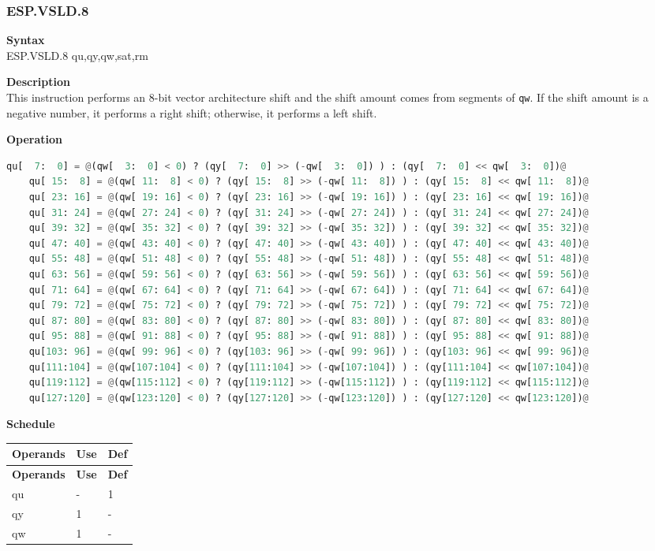 \newpage
\subsubsection{ESP.VSLD.8}\label{instruction:ESPVSLD8}
\textbf{Syntax}\\
ESP.VSLD.8 qu,qy,qw,sat,rm

\textbf{Description}\\
This instruction performs an 8-bit vector architecture shift and the shift amount comes from segments of \lstinline{qw}. If the shift amount is a negative number, it performs a right shift; otherwise, it performs a left shift.

\textbf{Operation}\\
\begin{lstlisting}[language=Python, escapechar=@]
    qu[  7:  0] = @(qw[  3:  0] < 0) ? (qy[  7:  0] >> (-qw[  3:  0]) ) : (qy[  7:  0] << qw[  3:  0])@
    qu[ 15:  8] = @(qw[ 11:  8] < 0) ? (qy[ 15:  8] >> (-qw[ 11:  8]) ) : (qy[ 15:  8] << qw[ 11:  8])@
    qu[ 23: 16] = @(qw[ 19: 16] < 0) ? (qy[ 23: 16] >> (-qw[ 19: 16]) ) : (qy[ 23: 16] << qw[ 19: 16])@
    qu[ 31: 24] = @(qw[ 27: 24] < 0) ? (qy[ 31: 24] >> (-qw[ 27: 24]) ) : (qy[ 31: 24] << qw[ 27: 24])@
    qu[ 39: 32] = @(qw[ 35: 32] < 0) ? (qy[ 39: 32] >> (-qw[ 35: 32]) ) : (qy[ 39: 32] << qw[ 35: 32])@
    qu[ 47: 40] = @(qw[ 43: 40] < 0) ? (qy[ 47: 40] >> (-qw[ 43: 40]) ) : (qy[ 47: 40] << qw[ 43: 40])@
    qu[ 55: 48] = @(qw[ 51: 48] < 0) ? (qy[ 55: 48] >> (-qw[ 51: 48]) ) : (qy[ 55: 48] << qw[ 51: 48])@
    qu[ 63: 56] = @(qw[ 59: 56] < 0) ? (qy[ 63: 56] >> (-qw[ 59: 56]) ) : (qy[ 63: 56] << qw[ 59: 56])@
    qu[ 71: 64] = @(qw[ 67: 64] < 0) ? (qy[ 71: 64] >> (-qw[ 67: 64]) ) : (qy[ 71: 64] << qw[ 67: 64])@
    qu[ 79: 72] = @(qw[ 75: 72] < 0) ? (qy[ 79: 72] >> (-qw[ 75: 72]) ) : (qy[ 79: 72] << qw[ 75: 72])@
    qu[ 87: 80] = @(qw[ 83: 80] < 0) ? (qy[ 87: 80] >> (-qw[ 83: 80]) ) : (qy[ 87: 80] << qw[ 83: 80])@
    qu[ 95: 88] = @(qw[ 91: 88] < 0) ? (qy[ 95: 88] >> (-qw[ 91: 88]) ) : (qy[ 95: 88] << qw[ 91: 88])@
    qu[103: 96] = @(qw[ 99: 96] < 0) ? (qy[103: 96] >> (-qw[ 99: 96]) ) : (qy[103: 96] << qw[ 99: 96])@
    qu[111:104] = @(qw[107:104] < 0) ? (qy[111:104] >> (-qw[107:104]) ) : (qy[111:104] << qw[107:104])@
    qu[119:112] = @(qw[115:112] < 0) ? (qy[119:112] >> (-qw[115:112]) ) : (qy[119:112] << qw[115:112])@
    qu[127:120] = @(qw[123:120] < 0) ? (qy[127:120] >> (-qw[123:120]) ) : (qy[127:120] << qw[123:120])@
\end{lstlisting}

\textbf{Schedule}\\
\begin{longtable}[c]{|l|l|l|}
    \hline
    \rowcolor{lightgray}
    \textbf{Operands} & \textbf{Use} & \textbf{Def} \\\hline
    \endfirsthead
    \hline
    \rowcolor{lightgray}
     \textbf{Operands} & \textbf{Use} & \textbf{Def} \\\hline
    \endhead
    \hline
    \endfoot

  qu & - & 1 \\\hline
  qy & 1 & - \\\hline
  qw & 1 & -

\end{longtable}

